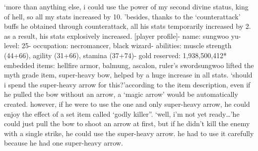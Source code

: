 ‘more than anything else, i could use the power of my second divine status, king of hell, so all my stats increased by 10.
’besides, thanks to the ‘counterattack’ buffs he obtained through counterattack, all his stats temporarily increased by 2.
 as a result, his stats explosively increased.
[player profile]- name: sungwoo yu- level: 25- occupation: necromancer, black wizard- abilities: muscle strength (44+66), agility (31+66), stamina (37+74)- gold reserved: 1,938,500,412* embedded items: hellfire armor, balmung, ascalon, ruler’s swordsungwoo lifted the myth grade item, super-heavy bow, helped by a huge increase in all stats.
‘should i spend the super-heavy arrow for this?’according to the item description, even if he pulled the bow without an arrow, a ‘magic arrow’ would be automatically created.
however, if he were to use the one and only super-heavy arrow, he could enjoy the effect of a set item called ‘godly killer”.
‘well, i’m not yet ready…’he could just pull the bow to shoot an arrow at first, but if he didn’t kill the enemy with a single strike, he could use the super-heavy arrow.
 he had to use it carefully because he had one super-heavy arrow.

